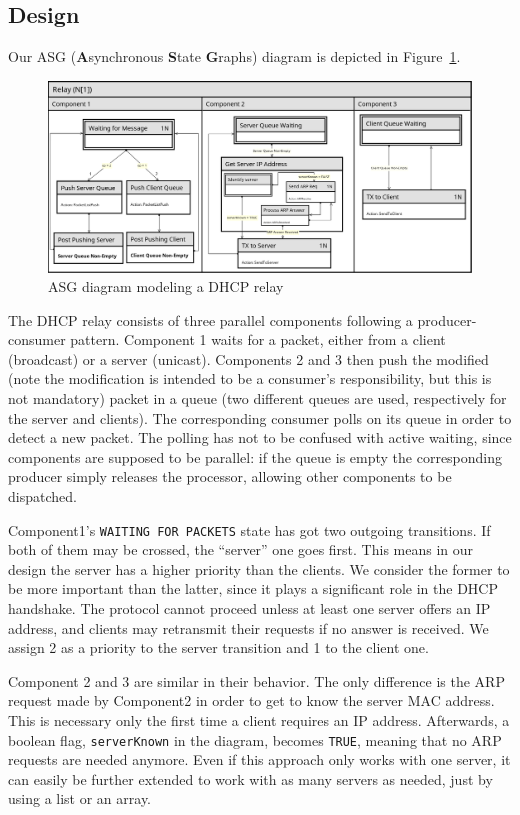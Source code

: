 \subsection{Design}
Our ASG (\textbf{A}synchronous \textbf{S}tate \textbf{G}raphs) diagram is depicted in Figure~\ref{fig:asg}.

\begin{figure}[h]
	\centerline{\includegraphics[width=1.15\textwidth]{images/asg-diagram}}
	\caption{ASG diagram modeling a DHCP relay}
	\label{fig:asg}
\end{figure}

The DHCP relay consists of three parallel components following a producer-consumer pattern. Component 1 waits for a packet, either from a client (broadcast) or a server (unicast). Components 2 and 3 then push the modified (note the modification is intended to be a consumer's responsibility, but this is not mandatory) packet in a queue (two different queues are used, respectively for the server and clients). The corresponding consumer polls on its queue in order to detect a new packet. The polling has not to be confused with active waiting, since components are supposed to be parallel: if the queue is empty the corresponding producer simply releases the processor, allowing other components to be dispatched.

Component1's \texttt{WAITING FOR PACKETS} state has got two outgoing transitions. If both of them may be crossed, the ``server'' one goes first. This means in our design the server has a higher priority than the clients. We consider the former to be more important than the latter, since it plays a significant role in the DHCP handshake. The protocol cannot proceed unless at least one server offers an IP address, and clients may retransmit their requests if no answer is received. We assign 2 as a priority to the server transition and 1 to the client one.

Component 2 and 3 are similar in their behavior. The only difference is the ARP request made by Component2 in order to get to know the server MAC address. This is necessary only the first time a client requires an IP address. Afterwards, a boolean flag, \texttt{serverKnown} in the diagram, becomes \texttt{TRUE}, meaning that no ARP requests are needed anymore. Even if this approach only works with one server, it can easily be further extended to work with as many servers as needed, just by using a list or an array.


